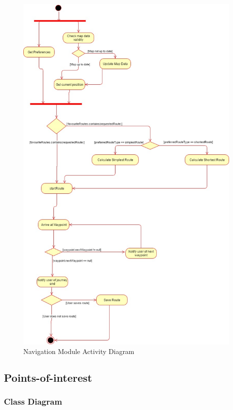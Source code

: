 \documentclass{article}
\begin{document}
        \begin{figure}[H]
        	\includegraphics[width=\textwidth]{Navigation_Activity_Diagram}
        	\caption{Navigation Module Activity Diagram}
        \end{figure}
        \newpage

    \subsection{Points-of-interest}

        \subsubsection{Class Diagram}
\end{document}

